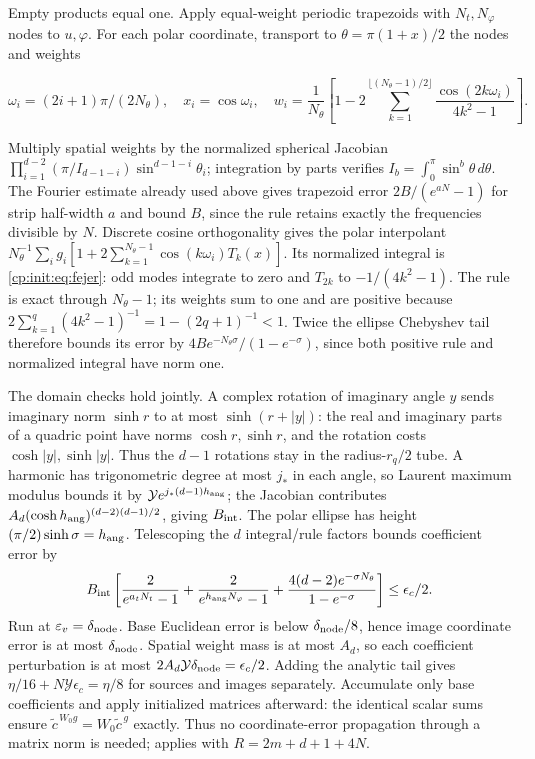 Empty products equal one. Apply equal-weight periodic trapezoids with
$N_t,N_\varphi$ nodes to $u,\varphi$. For each polar coordinate,
transport to $\theta=\pi(1+x)/2$ the nodes and weights

\begin{equation}
\label{cp:init:eq:fejer}
\omega_i=(2i+1)\pi/(2N_\theta),\quad x_i=\cos\omega_i,\quad
w_i=\frac1{N_\theta}\left[1-2\sum_{k=1}^{\lfloor(N_\theta-1)/2\rfloor}
                    \frac{\cos(2k\omega_i)}{4k^2-1}\right].
\end{equation}

Multiply spatial weights by the normalized spherical Jacobian
$\prod_{i=1}^{d-2}(\pi/I_{d-1-i})\sin^{d-1-i}\theta_i$;
integration by parts verifies $I_b=\int_0^\pi\sin^b\theta\,d\theta$.
The Fourier estimate already used above gives trapezoid error
$2B/(e^{aN}-1)$ for strip half-width $a$ and bound $B$, since
the rule retains exactly the frequencies divisible by $N$.
Discrete cosine orthogonality gives the polar interpolant
$N_\theta^{-1}\sum_i g_i[1+2\sum_{k=1}^{N_\theta-1}
\cos(k\omega_i)T_k(x)]$.
Its normalized integral is \eqref{cp:init:eq:fejer}: odd modes
integrate to zero and $T_{2k}$ to $-1/(4k^2-1)$.
The rule is exact through $N_\theta-1$; its weights sum to one and
are positive because $2\sum_{k=1}^q(4k^2-1)^{-1}=1-(2q+1)^{-1}<1$.
Twice the ellipse Chebyshev tail therefore bounds its error by
$4Be^{-N_\theta\sigma}/(1-e^{-\sigma})$, since both positive rule
and normalized integral have norm one.

The domain checks hold jointly. A complex rotation of imaginary angle
$y$ sends imaginary norm $\sinh r$ to at most $\sinh(r+|y|)$:
the real and imaginary parts of a quadric point have norms
$\cosh r,\sinh r$, and the rotation costs $\cosh|y|,\sinh|y|$.
Thus the $d-1$ rotations stay in the radius-$r_q/2$ tube.
A harmonic has trigonometric degree at most $j_*$ in each angle,
so Laurent maximum modulus bounds it by
$\mathcal Ye^{j_*(d-1)h_{\rm ang}}$; the Jacobian contributes
$A_d(\cosh h_{\rm ang})^{(d-2)(d-1)/2}$, giving $B_{\rm int}$.
The polar ellipse has height $(\pi/2)\sinh\sigma=h_{\rm ang}$.
Telescoping the $d$ integral/rule factors bounds coefficient error by
\[
B_{\rm int}\left[\frac2{e^{a_tN_t}-1}
 +\frac2{e^{h_{\rm ang}N_\varphi}-1}
 +\frac{4(d-2)e^{-\sigma N_\theta}}{1-e^{-\sigma}}\right]
 \le\epsilon_c/2.
\]
Run  at $\varepsilon_v=\delta_{\rm node}$.
Base Euclidean error is below $\delta_{\rm node}/8$, hence image
coordinate error is at most $\delta_{\rm node}$.
Spatial weight mass is at most $A_d$, so each coefficient perturbation
is at most $2A_d\mathcal Y\delta_{\rm node}=\epsilon_c/2$.
Adding the analytic tail gives
$\eta/16+N\mathcal Y\epsilon_c=\eta/8$ for sources and images separately.
Accumulate only base coefficients and apply initialized matrices afterward:
the identical scalar sums ensure
$\widetilde c^{\,W_0g}=W_0\widetilde c^{\,g}$ exactly.
Thus no coordinate-error propagation through a matrix norm is needed;
 applies with $R=2m+d+1+4N$.

